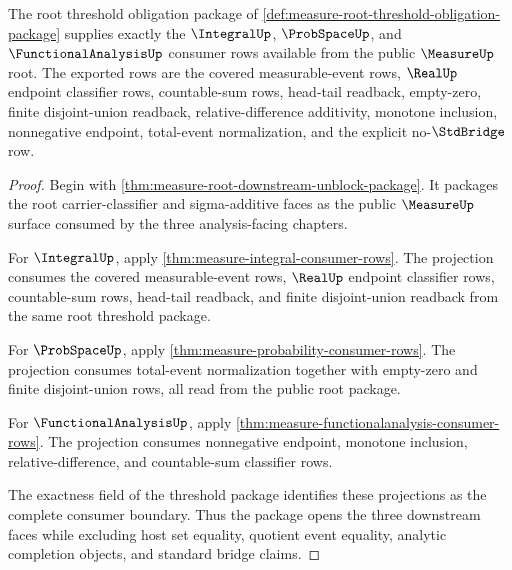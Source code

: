 \begin{theorem}
\label{thm:measure-root-threshold-analysis-consumer-obligation}
The root threshold obligation package of
\autoref{def:measure-root-threshold-obligation-package} supplies exactly the
$\IntegralUp$, $\ProbSpaceUp$, and $\FunctionalAnalysisUp$ consumer rows
available from the public $\MeasureUp$ root. The exported rows are the covered
measurable-event rows, $\RealUp$ endpoint classifier rows, countable-sum
rows, head-tail readback, empty-zero, finite disjoint-union readback,
relative-difference additivity, monotone inclusion, nonnegative endpoint,
total-event normalization, and the explicit no-$\StdBridge$ row.
\end{theorem}
\begin{proof}
Begin with \autoref{thm:measure-root-downstream-unblock-package}. It packages
the root carrier-classifier and sigma-additive faces as the public
$\MeasureUp$ surface consumed by the three analysis-facing chapters.

For $\IntegralUp$, apply \autoref{thm:measure-integral-consumer-rows}. The
projection consumes the covered measurable-event rows, $\RealUp$ endpoint
classifier rows, countable-sum rows, head-tail readback, and finite
disjoint-union readback from the same root threshold package.

For $\ProbSpaceUp$, apply \autoref{thm:measure-probability-consumer-rows}.
The projection consumes total-event normalization together with empty-zero
and finite disjoint-union rows, all read from the public root package.

For $\FunctionalAnalysisUp$, apply
\autoref{thm:measure-functionalanalysis-consumer-rows}. The projection
consumes nonnegative endpoint, monotone inclusion, relative-difference, and
countable-sum classifier rows.

The exactness field of the threshold package identifies these projections as
the complete consumer boundary. Thus the package opens the three downstream
faces while excluding host set equality, quotient event equality, analytic
completion objects, and standard bridge claims.
\end{proof}
